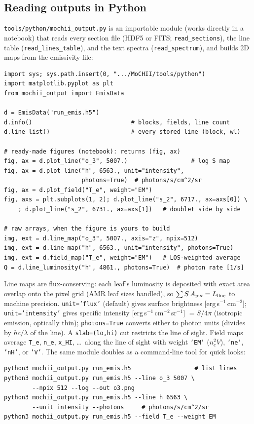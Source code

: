 \documentclass[english,a4paper]{my_memo}
\newcommand{\code}[1]{\texttt{#1}}
\begin{document}
\subsection{Reading outputs in Python}
\code{tools/python/mochii\_output.py} is an importable module (works
directly in a notebook) that reads every section file (HDF5 or FITS;
\code{read\_sections}), the line table (\code{read\_lines\_table}),
and the text spectra (\code{read\_spectrum}), and builds 2D maps from
the emissivity file:
\begin{verbatim}
import sys; sys.path.insert(0, ".../MoCHII/tools/python")
import matplotlib.pyplot as plt
from mochii_output import EmisData

d = EmisData("run_emis.h5")
d.info()                            # blocks, fields, line count
d.line_list()                       # every stored line (block, wl)

# ready-made figures (notebook): returns (fig, ax)
fig, ax = d.plot_line("o_3", 5007.)                  # log S map
fig, ax = d.plot_line("h", 6563., unit="intensity",
                      photons=True)  # photons/s/cm^2/sr
fig, ax = d.plot_field("T_e", weight="EM")
fig, axs = plt.subplots(1, 2); d.plot_line("s_2", 6717., ax=axs[0]) \
    ; d.plot_line("s_2", 6731., ax=axs[1])   # doublet side by side

# raw arrays, when the figure is yours to build
img, ext = d.line_map("o_3", 5007., axis="z", npix=512)
img, ext = d.line_map("h", 6563., unit="intensity", photons=True)
img, ext = d.field_map("T_e", weight="EM")   # LOS-weighted average
Q = d.line_luminosity("h", 4861., photons=True)  # photon rate [1/s]
\end{verbatim}
Line maps are flux-conserving: each leaf's luminosity is deposited
with exact area overlap onto the pixel grid (AMR leaf sizes handled),
so $\sum S\,A_{\rm pix} = L_{\rm line}$ to machine precision.
\code{unit='flux'} (default) gives surface brightness
[erg\,s$^{-1}$\,cm$^{-2}$]; \code{unit='intensity'} gives specific
intensity [erg\,s$^{-1}$\,cm$^{-2}$\,sr$^{-1}$] $= S/4\pi$ (isotropic
emission, optically thin); \code{photons=True} converts either to
photon units (divides by $hc/\lambda$ of the line).  A
\code{slab=(lo,hi)} cut restricts the line of sight.  Field maps
average \code{T\_e}, \code{n\_e}, \code{x\_HI}, \dots\ along the line
of sight with weight \code{'EM'} ($n_e^2 V$), \code{'ne'},
\code{'nH'}, or \code{'V'}.  The same module doubles as a
command-line tool for quick looks:
\begin{verbatim}
python3 mochii_output.py run_emis.h5                  # list lines
python3 mochii_output.py run_emis.h5 --line o_3 5007 \
        --npix 512 --log --out o3.png
python3 mochii_output.py run_emis.h5 --line h 6563 \
        --unit intensity --photons     # photons/s/cm^2/sr
python3 mochii_output.py run_emis.h5 --field T_e --weight EM
\end{verbatim}
\end{document}
